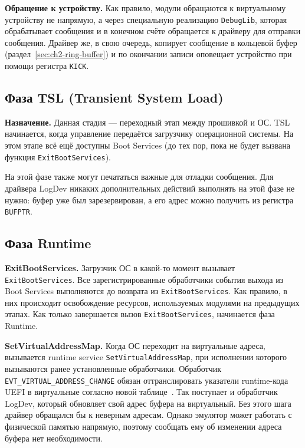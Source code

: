 \textbf{Обращение к устройству.} Как правило, модули обращаются к виртуальному устройству не напрямую, а через специальную реализацию \texttt{DebugLib}, которая обрабатывает сообщения и в конечном счёте обращается к драйверу для отправки сообщения. Драйвер же, в свою очередь, копирует сообщение в кольцевой буфер (раздел~\ref{sec:ch2-ring-buffer}) и по окончании записи оповещает устройство при помощи регистра \texttt{KICK}.

\subsection{Фаза TSL (Transient System Load)}

\textbf{Назначение.} Данная стадия --- переходный этап между прошивкой и ОС. TSL начинается, когда управление передаётся загрузчику операционной системы. На этом этапе всё ещё доступны Boot Services (до тех пор, пока не будет вызвана функция \texttt{ExitBootServices}).

На этой фазе также могут печататься важные для отладки сообщения. Для драйвера LogDev никаких дополнительных действий выполнять на этой фазе не нужно: буфер уже был зарезервирован, а его адрес можно получить из регистра \texttt{BUFPTR}.

\subsection{Фаза Runtime}

\textbf{ExitBootServices.} Загрузчик ОС в какой-то момент вызывает \\ \texttt{ExitBootServices}.
Все зарегистрированные обработчики события выхода из Boot Services выполняются до возврата из \texttt{ExitBootServices}. Как правило, в них происходит освобождение ресурсов, используемых модулями на предыдущих этапах.
Как только завершается вызов \texttt{ExitBootServices}, начинается фаза Runtime.

\textbf{SetVirtualAddressMap.} Когда ОС переходит на виртуальные адреса,
вызывается runtime service \texttt{SetVirtualAddressMap}, при исполнении которого вызываются ранее установленные обработчики. Обработчик
\texttt{EVT\_VIRTUAL\_ADDRESS\_CHANGE} обязан оттранслировать указатели runtime-кода UEFI в виртуальные согласно новой таблице~\cite{uefi_spec}. Так поступает и обработчик LogDev, который обновляет свой адрес буфера на виртуальный. Без этого шага драйвер обращался бы к неверным адресам. Однако эмулятор может работать с физической памятью напрямую, поэтому сообщать ему об изменении адреса буфера нет необходимости.

